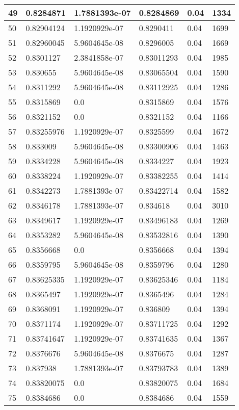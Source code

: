 \begin{longtable}{|l|l|l|l|l|l|}
49 & 0.8284871 & 1.7881393e-07 & 0.8284869 & 0.04 & 1334 \\ \hline 
50 & 0.82904124 & 1.1920929e-07 & 0.8290411 & 0.04 & 1699 \\ \hline 
51 & 0.82960045 & 5.9604645e-08 & 0.8296005 & 0.04 & 1669 \\ \hline 
52 & 0.8301127 & 2.3841858e-07 & 0.83011293 & 0.04 & 1985 \\ \hline 
53 & 0.830655 & 5.9604645e-08 & 0.83065504 & 0.04 & 1590 \\ \hline 
54 & 0.8311292 & 5.9604645e-08 & 0.83112925 & 0.04 & 1286 \\ \hline 
55 & 0.8315869 & 0.0 & 0.8315869 & 0.04 & 1576 \\ \hline 
56 & 0.8321152 & 0.0 & 0.8321152 & 0.04 & 1166 \\ \hline 
57 & 0.83255976 & 1.1920929e-07 & 0.8325599 & 0.04 & 1672 \\ \hline 
58 & 0.833009 & 5.9604645e-08 & 0.83300906 & 0.04 & 1463 \\ \hline 
59 & 0.8334228 & 5.9604645e-08 & 0.8334227 & 0.04 & 1923 \\ \hline 
60 & 0.8338224 & 1.1920929e-07 & 0.83382255 & 0.04 & 1414 \\ \hline 
61 & 0.8342273 & 1.7881393e-07 & 0.83422714 & 0.04 & 1582 \\ \hline 
62 & 0.8346178 & 1.7881393e-07 & 0.834618 & 0.04 & 3010 \\ \hline 
63 & 0.8349617 & 1.1920929e-07 & 0.83496183 & 0.04 & 1269 \\ \hline 
64 & 0.8353282 & 5.9604645e-08 & 0.83532816 & 0.04 & 1390 \\ \hline 
65 & 0.8356668 & 0.0 & 0.8356668 & 0.04 & 1394 \\ \hline 
66 & 0.8359795 & 5.9604645e-08 & 0.8359796 & 0.04 & 1280 \\ \hline 
67 & 0.83625335 & 1.1920929e-07 & 0.83625346 & 0.04 & 1184 \\ \hline 
68 & 0.8365497 & 1.1920929e-07 & 0.8365496 & 0.04 & 1284 \\ \hline 
69 & 0.8368091 & 1.1920929e-07 & 0.836809 & 0.04 & 1394 \\ \hline 
70 & 0.8371174 & 1.1920929e-07 & 0.83711725 & 0.04 & 1292 \\ \hline 
71 & 0.83741647 & 1.1920929e-07 & 0.83741635 & 0.04 & 1367 \\ \hline 
72 & 0.8376676 & 5.9604645e-08 & 0.8376675 & 0.04 & 1287 \\ \hline 
73 & 0.837938 & 1.7881393e-07 & 0.83793783 & 0.04 & 1389 \\ \hline 
74 & 0.83820075 & 0.0 & 0.83820075 & 0.04 & 1684 \\ \hline 
75 & 0.8384686 & 0.0 & 0.8384686 & 0.04 & 1559 \\ \hline 
\end{longtable}